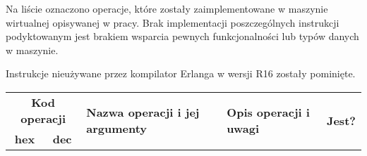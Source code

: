 Na liście oznaczono operacje, które zostały zaimplementowane w maszynie wirtualnej opisywanej w pracy. Brak implementacji poszczególnych instrukcji podyktowanym jest brakiem wsparcia pewnych funkcjonalności lub typów danych w maszynie.

Instrukcje nieużywane przez kompilator Erlanga w wersji R16 zostały pominięte.

\begin{longtable}{|c|c|p{5cm}|p{6.75cm}|c|}
\hline

\multicolumn{2}{|c|}{\textbf{Kod operacji}} & \multirow{2}{*}{\textbf{Nazwa operacji i jej argumenty}} & \multirow{2}{*}{\textbf{Opis operacji i uwagi}} & \multirow{2}{*}{\textbf{Jest?}} \\
\cline{1-2}
\textbf{hex} & \textbf{dec} & & & \\
\hline
\endhead


\end{longtable}

